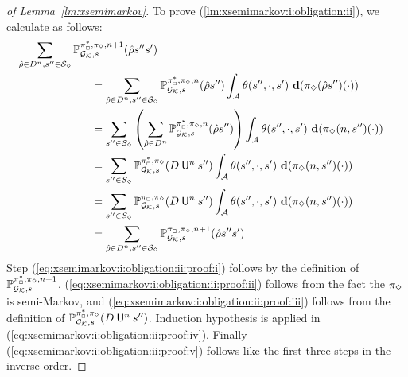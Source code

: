 \begin{proof}[of Lemma~\ref{lm:xsemimarkov}]
  To prove (\ref{lm:xsemimarkov:i:obligation:ii}), we calculate as
  follows:
  \begin{align}
    \sum_{\hat{\rho}\in D^n,s''\in\sgnmin}\Prob^{\starredstrat_{\maxplay},\strat_{\minplay},n+1}_{\StochGK,s}(\hat{\rho}s''s')
    \hspace{-6em}\notag\\
    & =
    \sum_{\hat{\rho}\in D^n,s''\in\sgnmin}\Prob^{\starredstrat_{\maxplay},\strat_{\minplay},n}_{\StochGK,s}(\hat{\rho}s'')\int_{\sgactions}\sgtrans(s'',\cdot,s')\ \diff(\strat_{\minplay}(\hat{\rho}s'')(\cdot))
    \label{eq:xsemimarkov:i:obligation:ii:proof:i} \\
    & =
    \sum_{s''\in\sgnmin}\left(\sum_{\hat{\rho}\in D^n}\Prob^{\starredstrat_{\maxplay},\strat_{\minplay},n}_{\StochGK,s}(\hat{\rho}s'')\right)\int_{\sgactions}\sgtrans(s'',\cdot,s')\ \diff(\strat_{\minplay}(n,s'')(\cdot))
    \label{eq:xsemimarkov:i:obligation:ii:proof:ii} \\
    & =
    \sum_{s''\in\sgnmin}\Prob^{\starredstrat_{\maxplay},\strat_{\minplay}}_{\StochGK,s}(D \Until^n s'')\int_{\sgactions}\sgtrans(s'',\cdot,s')\ \diff(\strat_{\minplay}(n,s'')(\cdot))
    \label{eq:xsemimarkov:i:obligation:ii:proof:iii} \\
    & =
    \sum_{s''\in\sgnmin}\Prob^{\strat_{\maxplay},\strat_{\minplay}}_{\StochGK,s}(D \Until^n s'')\int_{\sgactions}\sgtrans(s'',\cdot,s')\ \diff(\strat_{\minplay}(n,s'')(\cdot))
    \label{eq:xsemimarkov:i:obligation:ii:proof:iv} \\
    & =
    \sum_{\hat{\rho}\in D^n,s''\in\sgnmin}\Prob^{\strat_{\maxplay},\strat_{\minplay},n+1}_{\StochGK,s}(\hat{\rho}s''s')
    \label{eq:xsemimarkov:i:obligation:ii:proof:v}
  \end{align}
  Step (\ref{eq:xsemimarkov:i:obligation:ii:proof:i}) follows by the
  definition of
  $\mathbb{P}^{\pi^*_{{\Box}},\pi_{{\Diamond}},n+1}_{{\mathcal{G}_{\mathcal{K}}},s}$,
  (\ref{eq:xsemimarkov:i:obligation:ii:proof:ii}) follows from the
  fact the $\pi_{\Diamond}$ is semi-Markov, and
  (\ref{eq:xsemimarkov:i:obligation:ii:proof:iii}) follows from the
  definition of
  $\mathbb{P}^{\pi^*_{{\Box}},\pi_{{\Diamond}}}_{{\mathcal{G}_{\mathcal{K}}},s}(D \mathbin{\mathsf{U}}^n s'')$.
  Induction hypothesis is applied in
  (\ref{eq:xsemimarkov:i:obligation:ii:proof:iv}).
  Finally (\ref{eq:xsemimarkov:i:obligation:ii:proof:v}) follows like
  the first three steps in the inverse order.

  \medskip
  

\end{proof}
